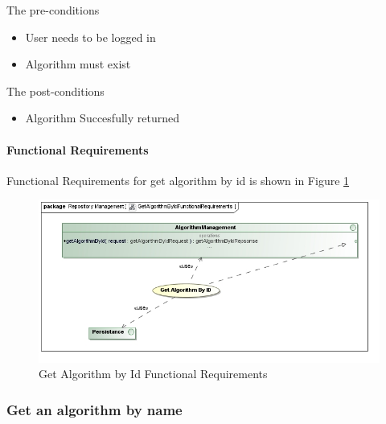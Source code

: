 The pre-conditions
\begin{itemize}
  \item User needs to be logged in
  \item Algorithm must exist
\end{itemize}

The post-conditions
\begin{itemize}
  \item Algorithm Succesfully returned
\end{itemize}
\paragraph{Functional Requirements}
Functional Requirements for get algorithm by id is shown in Figure \ref{fig:getAlgorithmByIdFunctionRequirements}

\begin{figure}[H]
  \begin{center}
  \includegraphics[scale=0.6]{../Diagrams and Charts/Test Data/GetAlgorithmByIdFunctionalRequirements.jpg}
  \caption{Get Algorithm by Id Functional Requirements}
  \label{fig:getAlgorithmByIdFunctionRequirements}
  \end{center}
  
\end{figure}

\subsubsection {Get an algorithm by name}


